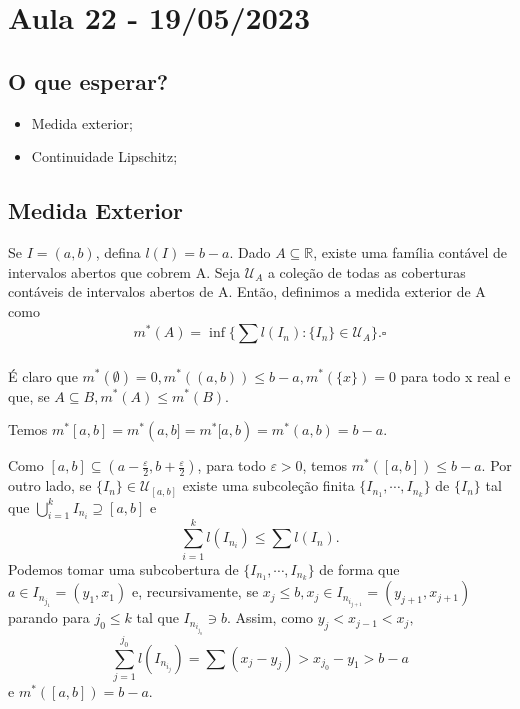 \documentclass[Analysis/analysis_notes.tex]{subfiles}
\begin{document}
\section{Aula 22 - 19/05/2023}
\subsection{O que esperar?}
\begin{itemize}
	\item Medida exterior;
	\item Continuidade Lipschitz;
\end{itemize}
\subsection{Medida Exterior}
\begin{def*}
	Se \(I=(a, b)\), defina \(l(I) = b-a.\) Dado \(A\subseteq{\mathbb{R}}\), existe
	uma família contável de intervalos abertos que cobrem A. Seja \(\mathcal{U}_{A}\)
	a cole\c cão de todas as coberturas contáveis de intervalos abertos de A. Então,
	definimos a medida exterior de A como
	\[
		m^{*}(A) = \inf\{\sum\limits_{}^{}l(I_{n}):\{I_{n}\}\in \mathcal{U}_{A}\}.\square
	\]
\end{def*}
É claro que \(m^{*}(\emptyset) = 0, m^{*}((a, b))\leq b-a, m^{*}(\{x\}) = 0\) para todo
x real e que, se \(A\subseteq{B}, m^{*}(A)\leq m^{*}(B).\)
\begin{lemma*}
	Temos \(m^{*}[a, b]=m^{*}(a, b]=m^{*}[a, b)=m^{*}(a, b) = b-a.\)
\end{lemma*}
\begin{proof*}
	Como \([a, b]\subseteq{(a-\frac{\varepsilon }{2}, b+\frac{\varepsilon }{2})}\), para todo \(\varepsilon >0\), temos
	\(m^{*}([a, b])\leq b-a.\) Por outro lado, se \(\{I_{n}\}\in \mathcal{U}_{[a, b]}\) existe
	uma subcole\c cão finita \(\{I_{n_{1}}, \cdots, I_{n_{k}}\}\) de \(\{I_{n}\}\) tal que
	\(\bigcup_{i=1}^{k}{I_{n_{i}}}\supseteq{[a, b]}\) e
	\[
		\sum\limits_{i=1}^{k}l(I_{n_{i}})\leq \sum\limits_{}^{}l(I_{n}).
	\]
	Podemos tomar uma subcobertura de \(\{I_{n_{1}}, \cdots, I_{n_{k}}\}\) de forma que
	\(a\in I_{n_{j_{1}}} = (y_{1}, x_{1})\) e, recursivamente, se \(x_{j}\leq b, x_{j}\in I_{n_{i_{j+1}}} = (y_{j+1},x_{j+1})\)
	parando para \(j_{0}\leq k\) tal que \(I_{n_{i_{j_{0}}}}\ni b\). Assim, como
	\(y_{j} < x_{j-1} < x_{j},\)
	\[
		\sum\limits_{j=1}^{j_{0}}l(I_{n_{i_{j}}}) = \sum\limits_{}^{}(x_{j} - y_{j}) > x_{j_{0}} - y_{1} > b - a
	\]
	e \(m^{*}([a, b]) = b-a.\) \qedsymbol
\end{proof*}
\end{document}
